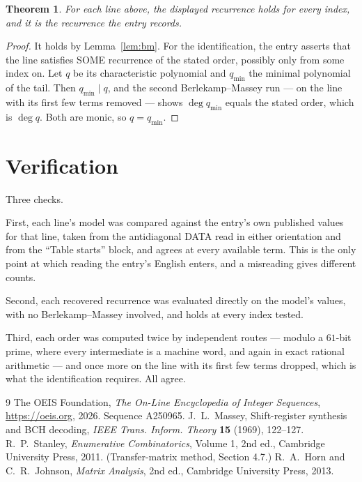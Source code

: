 \documentclass[11pt,a4paper]{article}
\theoremstyle{plain}
\newtheorem{theorem}{Theorem}
\theoremstyle{definition}
\begin{document}
\begin{theorem}
For each line above, the displayed recurrence holds for every index, and it is the recurrence
the entry records.
\end{theorem}

\begin{proof}
It holds by Lemma~\ref{lem:bm}. For the identification, the entry asserts that the line
satisfies SOME recurrence of the stated order, possibly only from some index on. Let $q$ be its
characteristic polynomial and $q_{\min}$ the minimal polynomial of the tail. Then
$q_{\min}\mid q$, and the second Berlekamp--Massey run --- on the line with its first few
terms removed --- shows $\deg q_{\min}$ equals the stated order, which is $\deg q$. Both are
monic, so $q=q_{\min}$.
\end{proof}

\section{Verification}

Three checks.

First, each line's model was compared against the entry's own published values for that line,
taken from the antidiagonal DATA read in either orientation and from the ``Table starts''
block, and agrees at every available term. This is the only point at which reading the entry's
English enters, and a misreading gives different counts.

Second, each recovered recurrence was evaluated directly on the model's values, with no
Berlekamp--Massey involved, and holds at every index tested.

Third, each order was computed twice by independent routes --- modulo a $61$-bit prime, where
every intermediate is a machine word, and again in exact rational arithmetic --- and once more
on the line with its first few terms dropped, which is what the identification requires. All
agree.

\begin{thebibliography}{9}
 The OEIS Foundation, \emph{The On-Line Encyclopedia of Integer
Sequences}, \url{https://oeis.org}, 2026. Sequence A250965.
 J.~L.~Massey, Shift-register synthesis and BCH decoding, \emph{IEEE
Trans. Inform. Theory} \textbf{15} (1969), 122--127.
 R.~P.~Stanley, \emph{Enumerative Combinatorics}, Volume 1, 2nd ed.,
Cambridge University Press, 2011. (Transfer-matrix method, Section 4.7.)
 R.~A.~Horn and C.~R.~Johnson, \emph{Matrix Analysis}, 2nd ed., Cambridge
University Press, 2013.
\end{thebibliography}
\end{document}
